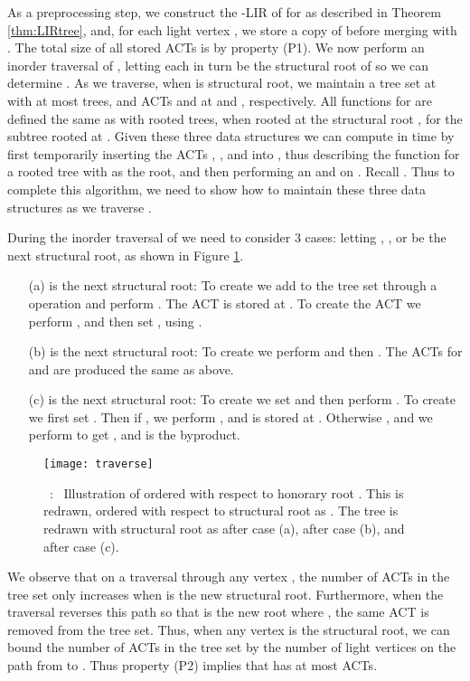 \documentclass[11pt]{article}
\newcommand\myCaption[1]{\small\refstepcounter{figure}\figurename\ \thefigure :\ #1}
\begin{document}
As a preprocessing step, we construct the -LIR of  for  as described in Theorem \ref{thm:LIRtree}, and, for each light vertex , we store a copy of  before merging with .  The total size of all stored ACTs is  by property (P1).  
We now perform an inorder traversal of , letting each  in turn be the structural root of  so we can determine .  
As we traverse, when  is structural root, we maintain a tree set  at  with at most  trees, and ACTs  and  at  and , respectively.  
All functions  for  are defined the same as with rooted trees, when rooted at the structural root , for the subtree rooted at .   
Given these three data structures we can compute  in  time by first temporarily inserting the ACTs , , and  into , thus describing the function  for a rooted tree with  as the root, and then performing an  and  on .  Recall .  
Thus to complete this algorithm, we need to show how to maintain these three data structures as we traverse .  

During the inorder traversal of  we need to consider 3 cases: letting , , or  be the next structural root, as shown in Figure \ref{fig:traverse}.  
\begin{itemize}
\item[(a)]  is the next structural root: 
To create  we add  to the tree set  through a  operation and perform .  
The ACT  is stored at .  
To create the ACT  we perform , and then set , using .  

\item[(b)]  is the next structural root: 
To create  we perform  and then .  
The ACTs for  and  are produced the same as above.  

\item[(c)]  is the next structural root: 
To create  we set  and then perform .
To create  we first set .  
Then if , we perform , and  is stored at .
Otherwise , and we perform  to get , and  is the byproduct.  
\end{itemize}

\begin{figure}
\begin{center}
\texttt{[image: traverse]}
\end{center}
\myCaption{\label{fig:traverse} Illustration of  ordered with respect to honorary root .  This is redrawn, ordered with respect to  structural root as .  The tree is redrawn with structural root as  after case (a),  after case (b), and  after case (c).}
\end{figure}


We observe that on a traversal through any vertex , the number of ACTs in the tree set  only increases when  is the new structural root.  Furthermore, when the traversal reverses this path so that  is the new root where , the same ACT is removed from the tree set.  Thus, when any vertex  is the structural root, we can bound the number of ACTs in the tree set  by the number of light vertices on the path from  to .  Thus property (P2) implies that  has at most  ACTs.  
\end{document}
